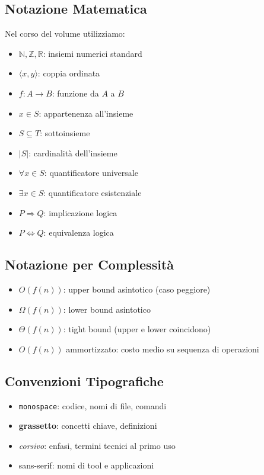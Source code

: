 \subsection{Notazione Matematica}

Nel corso del volume utilizziamo:

\begin{itemize}
\item $\mathbb{N}, \mathbb{Z}, \mathbb{R}$: insiemi numerici standard
\item $\langle x, y \rangle$: coppia ordinata
\item $f: A \to B$: funzione da $A$ a $B$
\item $x \in S$: appartenenza all'insieme
\item $S \subseteq T$: sottoinsieme
\item $|S|$: cardinalità dell'insieme
\item $\forall x \in S$: quantificatore universale
\item $\exists x \in S$: quantificatore esistenziale
\item $P \Rightarrow Q$: implicazione logica
\item $P \Leftrightarrow Q$: equivalenza logica
\end{itemize}

\subsection{Notazione per Complessità}

\begin{itemize}
\item $O(f(n))$: upper bound asintotico (caso peggiore)
\item $\Omega(f(n))$: lower bound asintotico
\item $\Theta(f(n))$: tight bound (upper e lower coincidono)
\item $O(f(n))$ ammortizzato: costo medio su sequenza di operazioni
\end{itemize}

\subsection{Convenzioni Tipografiche}

\begin{itemize}
\item \texttt{monospace}: codice, nomi di file, comandi
\item \textbf{grassetto}: concetti chiave, definizioni
\item \textit{corsivo}: enfasi, termini tecnici al primo uso
\item \textsf{sans-serif}: nomi di tool e applicazioni
\end{itemize}

